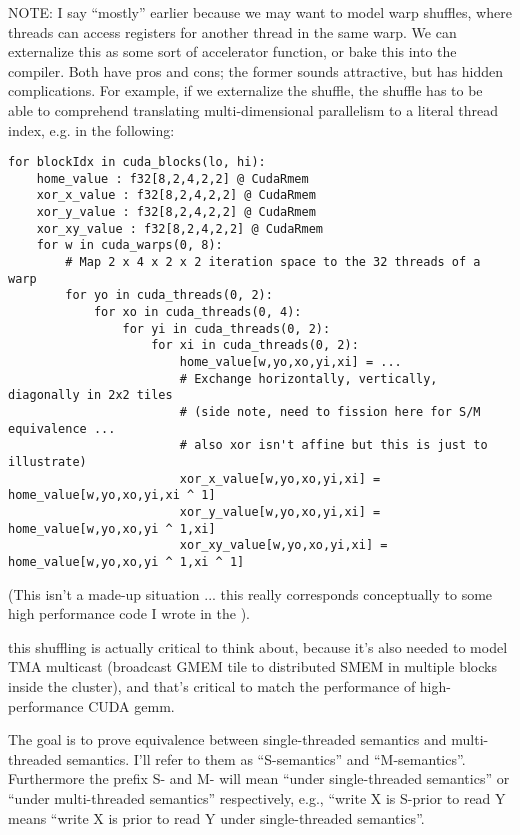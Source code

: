 \filbreak
NOTE: I say ``mostly'' earlier because we may want to model warp shuffles, where threads can access registers for another thread in the same warp.
We can externalize this as some sort of accelerator function, or bake this into the compiler.
Both have pros and cons; the former sounds attractive, but has hidden complications.
For example, if we externalize the shuffle, the shuffle has to be able to comprehend translating multi-dimensional parallelism to a literal thread index, e.g. in the following:

{\color{lightttColor}
\begin{verbatim}
for blockIdx in cuda_blocks(lo, hi):
    home_value : f32[8,2,4,2,2] @ CudaRmem
    xor_x_value : f32[8,2,4,2,2] @ CudaRmem
    xor_y_value : f32[8,2,4,2,2] @ CudaRmem
    xor_xy_value : f32[8,2,4,2,2] @ CudaRmem
    for w in cuda_warps(0, 8):
        # Map 2 x 4 x 2 x 2 iteration space to the 32 threads of a warp
        for yo in cuda_threads(0, 2):
            for xo in cuda_threads(0, 4):
                for yi in cuda_threads(0, 2):
                    for xi in cuda_threads(0, 2):
                        home_value[w,yo,xo,yi,xi] = ...
                        # Exchange horizontally, vertically, diagonally in 2x2 tiles
                        # (side note, need to fission here for S/M equivalence ...
                        # also xor isn't affine but this is just to illustrate)
                        xor_x_value[w,yo,xo,yi,xi] = home_value[w,yo,xo,yi,xi ^ 1]
                        xor_y_value[w,yo,xo,yi,xi] = home_value[w,yo,xo,yi ^ 1,xi]
                        xor_xy_value[w,yo,xo,yi,xi] = home_value[w,yo,xo,yi ^ 1,xi ^ 1]
\end{verbatim}
}
(This isn't a made-up situation ... this really corresponds conceptually to some high performance code I wrote in the ).

\filbreak
{} this shuffling is actually critical to think about, because it's also needed to model TMA multicast (broadcast GMEM tile to distributed SMEM in multiple blocks inside the cluster), and that's critical to match the performance of high-performance CUDA gemm.

\newpage
{}

The goal is to prove equivalence between single-threaded semantics and multi-threaded semantics.
I'll refer to them as ``S-semantics'' and ``M-semantics''.
Furthermore the prefix S- and M- will mean ``under single-threaded semantics'' or ``under multi-threaded semantics'' respectively, e.g., ``write X is S-prior to read Y means ``write X is prior to read Y under single-threaded semantics''.

